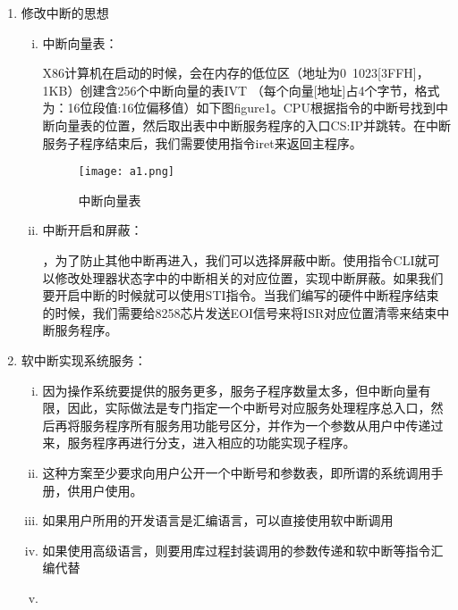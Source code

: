 \documentclass[UTF8]{article}
\newcommand{\bg}{\colorbox{gray!13}}%
\newcommand{\red}{\color{red}}
\begin{document}
\begin{enumerate}[1)]
	\item 修改中断的思想
		\begin{enumerate}[i)]
		\heiti \setlength{\itemsep}{0.2ex}
			\item 中断向量表：\par X86计算机在启动的时候，会在内存的低位区（地址为0~1023[3FFH]，1KB）创建含256个中断向量的表IVT （每个向量[地址]占4个字节，格式为：16位段值:16位偏移值）如下图figure1。CPU根据指令的中断号找到中断向量表的位置，然后取出表中中断服务程序的入口CS:IP并跳转。在中断服务子程序结束后，我们需要使用指令iret来返回主程序。
			\begin{figure}[htbp]
				\centering
				\texttt{[image: a1.png]}
				\caption{中断向量表}
			\end{figure}
			\newpage
			\item 中断开启和屏蔽：\par{}，为了防止其他中断再进入，我们可以选择屏蔽中断。使用指令\bg{CLI}就可以修改处理器状态字中的中断相关的对应位置，实现中断屏蔽。如果我们要开启中断的时候就可以使用\bg{STI}指令。当我们编写的硬件中断程序结束的时候，我们需要给8258芯片发送EOI信号来将ISR对应位置清零来结束中断服务程序。
		\end{enumerate}
	\item 软中断实现系统服务：
	\heiti
	\begin{enumerate}[i)]
		\item 因为操作系统要提供的服务更多，服务子程序数量太多，但中断向量有限，因此，实际做法是专门指定一个中断号对应服务处理程序总入口，然后再将服务程序所有服务用功能号区分，并作为一个参数从用户中传递过来，服务程序再进行分支，进入相应的功能实现子程序。
		\item 这种方案至少要求向用户公开一个中断号和参数表，即所谓的系统调用手册，供用户使用。
		\item 如果用户所用的开发语言是汇编语言，可以直接使用软中断调用
		\item 如果使用高级语言，则要用库过程封装调用的参数传递和软中断等指令汇编代替
		\item \red{规定系统调用服务的中断号是21h。}
	\end{enumerate}	
\end{enumerate}
\end{document}
